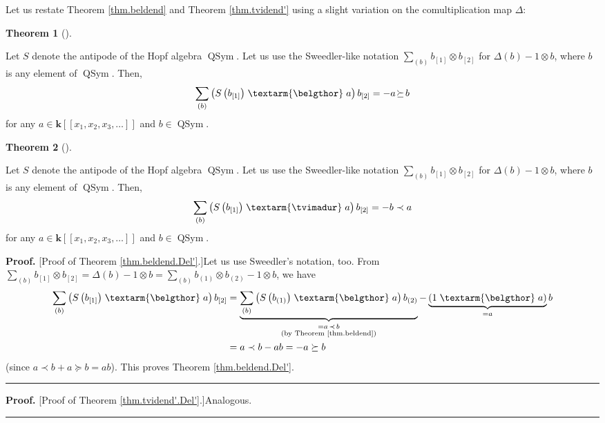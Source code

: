 \documentclass[numbers=enddot,12pt,final,onecolumn,notitlepage]{scrartcl}%
\theoremstyle{definition}
\newtheorem{theo}{Theorem}[section]
\newenvironment{theorem}[1][]
{\begin{theo}[#1]\begin{leftbar}}
{\end{leftbar}\end{theo}}
\newenvironment{proof}[1][Proof]{\noindent\textbf{#1.} }{\ \rule{0.5em}{0.5em}}
\newenvironment{noncompile}{}{}
\newcommand{\tvi}{\left. \textarm{\tvimadur} \right.}
\newcommand{\bel}{\left. \textarm{\belgthor} \right.}
\let\sumnonlimits\sum
\renewcommand{\sum}{\sumnonlimits\limits}
\begin{document}
\begin{noncompile}
Let us restate Theorem \ref{thm.beldend} and Theorem \ref{thm.tvidend'} using
a slight variation on the comultiplication map $\Delta$:

\begin{theorem}
\label{thm.beldend.Del'}Let $S$ denote the antipode of the Hopf algebra
$\operatorname*{QSym}$. Let us use the Sweedler-like notation $\sum_{\left(
b\right)  }b_{\left[  1\right]  }\otimes b_{\left[  2\right]  }$ for
$\Delta\left(  b\right)  -1\otimes b$, where $b$ is any element of
$\operatorname*{QSym}$. Then,%
\[
\sum_{\left(  b\right)  }\left(  S\left(  b_{\left[  1\right]  }\right)
\bel
a\right)  b_{\left[  2\right]  }=-a\mathfrak{\left.  \succeq\right.  }b
\]
for any $a\in\mathbf{k}\left[  \left[  x_{1},x_{2},x_{3},\ldots\right]
\right]  $ and $b\in\operatorname*{QSym}$.
\end{theorem}

\begin{theorem}
\label{thm.tvidend'.Del'}Let $S$ denote the antipode of the Hopf algebra
$\operatorname*{QSym}$. Let us use the Sweedler-like notation $\sum_{\left(
b\right)  }b_{\left[  1\right]  }\otimes b_{\left[  2\right]  }$ for
$\Delta\left(  b\right)  -1\otimes b$, where $b$ is any element of
$\operatorname*{QSym}$. Then,%
\[
\sum_{\left(  b\right)  }\left(  S\left(  b_{\left[  1\right]  }\right)
\tvi
a\right)  b_{\left[  2\right]  }=-b\left.  \prec\right.  a
\]
for any $a\in\mathbf{k}\left[  \left[  x_{1},x_{2},x_{3},\ldots\right]
\right]  $ and $b\in\operatorname*{QSym}$.
\end{theorem}

\begin{proof}
[Proof of Theorem \ref{thm.beldend.Del'}.]Let us use Sweedler's notation, too.
From $\sum_{\left(  b\right)  }b_{\left[  1\right]  }\otimes b_{\left[
2\right]  }=\Delta\left(  b\right)  -1\otimes b=\sum_{\left(  b\right)
}b_{\left(  1\right)  }\otimes b_{\left(  2\right)  }-1\otimes b$, we have%
\begin{align*}
\sum_{\left(  b\right)  }\left(  S\left(  b_{\left[  1\right]  }\right)
\bel a\right)  b_{\left[  2\right]  }  &  =\underbrace{\sum_{\left(  b\right)
}\left(  S\left(  b_{\left(  1\right)  }\right)  \bel a\right)  b_{\left(
2\right)  }}_{\substack{=a\left.  \prec\right.  b\\\text{(by Theorem
\ref{thm.beldend})}}}-\underbrace{\left(  1\bel a\right)  }_{=a}b\\
&  =a\left.  \prec\right.  b-ab=-a\left.  \succeq\right.  b
\end{align*}
(since $a\left.  \prec\right.  b+a\left.  \succeq\right.  b=ab$). This proves
Theorem \ref{thm.beldend.Del'}.
\end{proof}

\begin{proof}
[Proof of Theorem \ref{thm.tvidend'.Del'}.]Analogous.
\end{proof}
\end{noncompile}
\end{document}
